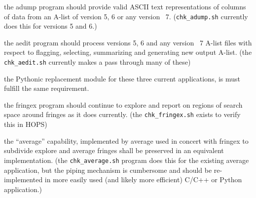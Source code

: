 \begin{description}
 the \acs{adump} program should provide valid ASCII text
    representations of columns of data from an \acs{A-list} of version
    5, 6 or any version \TBD~7.
    (\texttt{chk\_adump.sh} currently does this for versions 5 and 6.)

 the \acs{aedit} program should process versions 5, 6 and
    any version \TBD~7 \acs{A-list} files with respect to flagging,
    selecting, summarizing and generating new output \acs{A-list}.
    (the \texttt{chk\_aedit.sh} currently makes a pass through many
    of these)

 the \acs{Python}ic replacement module for these three current
    applications, is must fulfill the same requirement.

 the \acs{fringex} program should continue to explore and report
    on regions of search space around fringes as it does currently.
    (the \texttt{chk\_fringex.sh} exists to verify this in \acs{HOPS})

 the ``average'' capability, implemented by \ac{average}
    used in concert with \ac{fringex} to subdivide explore and average
    fringes shall be preserved in an equivalent implementation.
    (the \texttt{chk\_average.sh} program does this for the existing
    \ac{average} application, but the piping mechanism is cumbersome
    and should be re-implemented in more easily used (and likely more
    efficient) C/C++ or \ac{Python} application.)


\end{description}
